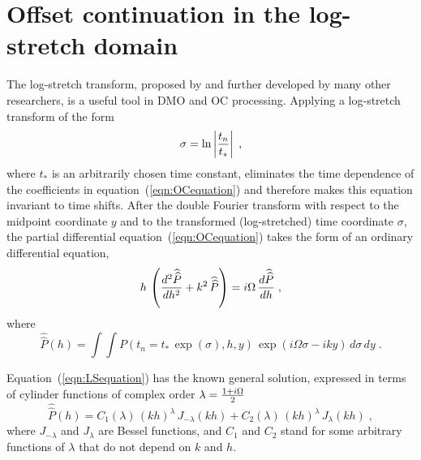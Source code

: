 \section{Offset continuation in the log-stretch domain}
The log-stretch transform, proposed by \cite{GPR30-06-08130828}
and further developed by many other researchers, is a useful
tool in DMO and OC processing. Applying a log-stretch transform of the
form
\begin{equation}
\sigma = \ln\left|t_n \over t_* \right|\;, 
\label{eqn:log}
\end{equation}
where $t_*$ is an arbitrarily chosen time constant, eliminates the
time dependence of the coefficients in equation~(\ref{eqn:OCequation})
and therefore makes this equation invariant to time shifts. After the
double Fourier transform with respect to the midpoint coordinate $y$
and to the transformed (log-stretched) time coordinate $\sigma$, the
partial differential equation~(\ref{eqn:OCequation}) takes the form of
an ordinary differential equation,
\begin{equation}
h\,\left({{d^2 \widehat{\widehat{P}}} 
\over {dh^2}} + k^2\,\widehat{\widehat{P}}\right) =
i\Omega\,{{d \widehat{\widehat{P}}} \over {dh}}\;,
\label{eqn:LSequation}
\end{equation}
where
\begin{equation}
\widehat{\widehat{P}}(h) = \int\!\int P(t_n=t_*\,\exp(\sigma),h,y)\,
\exp(i\Omega\sigma - iky)\,d\sigma\,dy\;. 
\label{eqn:LSFT}
\end{equation}

Equation~(\ref{eqn:LSequation}) has the known general solution,
expressed in terms of cylinder functions of complex order $\lambda =
{{1+i\Omega} \over 2}$ \cite[]{watson}
\begin{equation}
\widehat{\widehat{P}}(h) = 
C_1(\lambda)\,(kh)^{\lambda}\,J_{-\lambda}(kh)+
C_2(\lambda)\,(kh)^{\lambda}\,J_{\lambda}(kh)\;,
\label{eqn:gensol}
\end{equation}
where $J_{-\lambda}$ and $J_{\lambda}$ are Bessel functions, and $C_1$
and $C_2$ stand for some arbitrary functions of $\lambda$ that do not
depend on $k$ and $h$.

